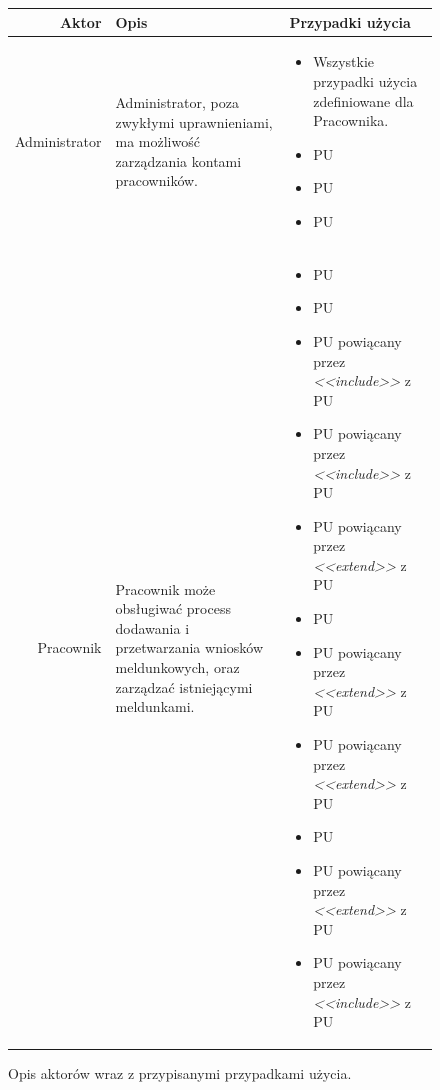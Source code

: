 \documentclass[12pt]{article}
\begin{document}
\begin{figure}[!h]
    \centering
    \begin{tabular}{|r|p{5cm}|p{9cm}|}
        \hline
        \textbf{Aktor} & \textbf{Opis} & \textbf{Przypadki użycia} \\
        \hline
        Administrator & 
        Administrator, poza zwykłymi uprawnieniami, ma możliwość zarządzania kontami pracowników.
        & 
        \begin{itemize}
            \setlength\itemsep{-0.5em}
            \item Wszystkie przypadki użycia zdefiniowane dla Pracownika.
            \item PU \nameref{Stworzenie konta pracownika}
            \item PU \nameref{Edycja konta pracownika}
            \item PU \nameref{Usunięcie konta pracownika}
        \end{itemize}
        \\
        \hline
        Pracownik & 
        Pracownik może obsługiwać process dodawania i przetwarzania wniosków meldunkowych, oraz zarządzać istniejącymi meldunkami.
        & 
        \begin{itemize}
            \setlength\itemsep{-0.5em}
            \item PU \nameref{Zalogowanie}
            \item PU \nameref{Wylogowanie}
            \item PU \nameref{Dodanie wniosku} powiącany przez \textit{<<include>>} z PU \nameref{Sprawdzenie poprawności danych}
            \item PU \nameref{Edycja danych wniosku} powiącany przez \textit{<<include>>} z PU \nameref{Sprawdzenie poprawności danych}
            \item PU \nameref{Zmiana statusu wniosku} powiącany przez \textit{<<extend>>} z PU \nameref{Edycja danych wniosku}
            \item PU \nameref{Wyświetlanie wniosków}
            \item PU \nameref{Zmiana kryterium wyświetlania wniosków} powiącany przez \textit{<<extend>>} z PU \nameref{Wyświetlanie wniosków}
            \item PU \nameref{Dodanie meldunku} powiącany przez \textit{<<extend>>} z PU \nameref{Zmiana statusu wniosku}
            \item PU \nameref{Wyświetlanie meldunków}
            \item PU \nameref{Zmiana kryterium wyświetlania meldunków} powiącany przez \textit{<<extend>>} z PU \nameref{Wyświetlanie meldunków}
            \item PU \nameref{Edycja danych meldunku} powiącany przez \textit{<<include>>} z PU \nameref{Sprawdzenie poprawności danych}

        \end{itemize}
        \\
        \hline
    \end{tabular}
    \caption{Opis aktorów wraz z przypisanymi przypadkami użycia.}
\end{figure}
\end{document}
